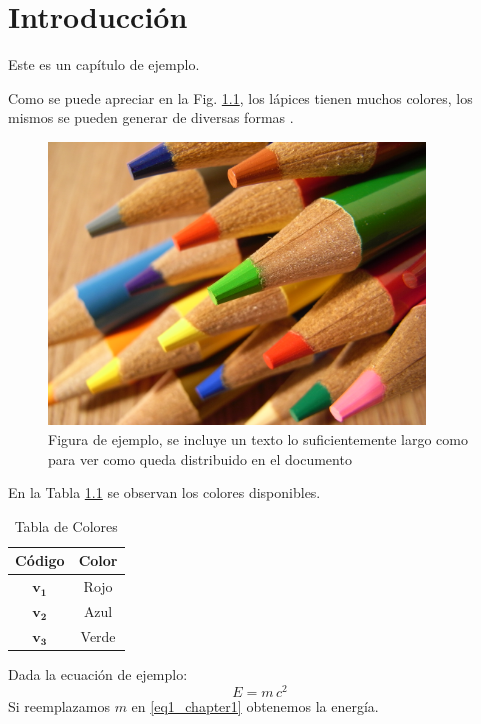 \chapter{Introducción} \label{intro}
Este es un capítulo de ejemplo. 

Como se puede apreciar en la Fig. \ref{fig1_intro}, los lápices tienen muchos colores, los mismos se pueden generar de diversas formas \cite{ejemplo}.
\begin{figure}[htb]
	\centering
	\includegraphics[width=10cm]{figs/chapter1/sample.jpg}
	\caption[Figura de ejemplo]{Figura de ejemplo, se incluye un texto lo suficientemente largo como para ver como queda distribuido en el documento}
	\label{fig1_intro}
\end{figure}

En la Tabla \ref{table1_intro} se observan los colores disponibles.
\begin{table}[htb]
\renewcommand{\arraystretch}{1.3}
	\caption{Tabla de Colores}
	\label{table1_intro}
	\centering
	\setlength\tabcolsep{2pt}
	\begin{tabular}{c c}
		\hline
		\bfseries Código & \bfseries Color\\
		\hline
		$\mathbf{v_1}$ & Rojo\\
		$\mathbf{v_2}$ & Azul\\
		$\mathbf{v_3}$ & Verde\\
		\hline
	\end{tabular}
\end{table}

Dada la ecuación de ejemplo:
\begin{equation}
	\label{eq1_chapter1}
	E=m\,c^2
\end{equation}
Si reemplazamos $m$ en \eqref{eq1_chapter1} obtenemos la energía.

